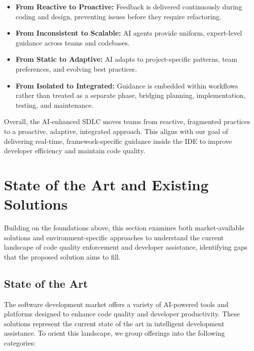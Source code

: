 \begin{spacing}{1.2}
\begin{itemize}
\item \textbf{From Reactive to Proactive:} Feedback is delivered continuously during coding and design, preventing issues before they require refactoring.
\item \textbf{From Inconsistent to Scalable:} AI agents provide uniform, expert-level guidance across teams and codebases.
\item \textbf{From Static to Adaptive:} AI adapts to project-specific patterns, team preferences, and evolving best practices.
\item \textbf{From Isolated to Integrated:} Guidance is embedded within workflows rather than treated as a separate phase, bridging planning, implementation, testing, and maintenance.
\end{itemize}

Overall, the AI‑enhanced SDLC moves teams from reactive, fragmented practices to a proactive, adaptive, integrated approach. This aligns with our goal of delivering real‑time, framework‑specific guidance inside the IDE to improve developer efficiency and maintain code quality.

\section{State of the Art and Existing Solutions}

Building on the foundations above, this section examines both market-available solutions and environment-specific approaches to understand the current landscape of code quality enforcement and developer assistance, identifying gaps that the proposed solution aims to fill.

\subsection{State of the Art}

The software development market offers a variety of AI-powered tools and platforms designed to enhance code quality and developer productivity. These solutions represent the current state of the art in intelligent development assistance. To orient this landscape, we group offerings into the following categories:



\end{spacing}
